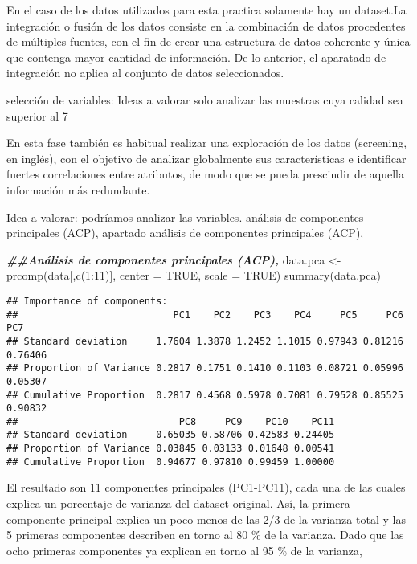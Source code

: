 \documentclass[
]{article}
\newenvironment{Shaded}{\begin{snugshade}}{\end{snugshade}}
\newcommand{\AttributeTok}[1]{\textcolor[rgb]{0.77,0.63,0.00}{#1}}
\newcommand{\ConstantTok}[1]{\textcolor[rgb]{0.00,0.00,0.00}{#1}}
\newcommand{\DecValTok}[1]{\textcolor[rgb]{0.00,0.00,0.81}{#1}}
\newcommand{\DocumentationTok}[1]{\textcolor[rgb]{0.56,0.35,0.01}{\textbf{\textit{#1}}}}
\newcommand{\FunctionTok}[1]{\textcolor[rgb]{0.00,0.00,0.00}{#1}}
\newcommand{\NormalTok}[1]{#1}
\newcommand{\OtherTok}[1]{\textcolor[rgb]{0.56,0.35,0.01}{#1}}
\newcommand{\SpecialCharTok}[1]{\textcolor[rgb]{0.00,0.00,0.00}{#1}}
\begin{document}
En el caso de los datos utilizados para esta practica solamente hay un
dataset.La integración o fusión de los datos consiste en la combinación
de datos procedentes de múltiples fuentes, con el fin de crear una
estructura de datos coherente y única que contenga mayor cantidad de
información. De lo anterior, el aparatado de integración no aplica al
conjunto de datos seleccionados.

selección de variables: Ideas a valorar solo analizar las muestras cuya
calidad sea superior al 7

En esta fase también es habitual realizar una exploración de los datos
(screening, en inglés), con el objetivo de analizar globalmente sus
características e identificar fuertes correlaciones entre atributos, de
modo que se pueda prescindir de aquella información más redundante.

Idea a valorar: podríamos analizar las variables. análisis de
componentes principales (ACP), apartado análisis de componentes
principales (ACP),

\begin{Shaded}
\begin{Highlighting}[]
\DocumentationTok{\#\#Análisis de componentes principales (ACP),}
\NormalTok{data.pca }\OtherTok{\textless{}{-}} \FunctionTok{prcomp}\NormalTok{(data[,}\FunctionTok{c}\NormalTok{(}\DecValTok{1}\SpecialCharTok{:}\DecValTok{11}\NormalTok{)], }\AttributeTok{center =} \ConstantTok{TRUE}\NormalTok{, }\AttributeTok{scale =} \ConstantTok{TRUE}\NormalTok{)}
\FunctionTok{summary}\NormalTok{(data.pca)}
\end{Highlighting}
\end{Shaded}

\begin{verbatim}
## Importance of components:
##                           PC1    PC2    PC3    PC4     PC5     PC6     PC7
## Standard deviation     1.7604 1.3878 1.2452 1.1015 0.97943 0.81216 0.76406
## Proportion of Variance 0.2817 0.1751 0.1410 0.1103 0.08721 0.05996 0.05307
## Cumulative Proportion  0.2817 0.4568 0.5978 0.7081 0.79528 0.85525 0.90832
##                            PC8     PC9    PC10    PC11
## Standard deviation     0.65035 0.58706 0.42583 0.24405
## Proportion of Variance 0.03845 0.03133 0.01648 0.00541
## Cumulative Proportion  0.94677 0.97810 0.99459 1.00000
\end{verbatim}

El resultado son 11 componentes principales (PC1-PC11), cada una de las
cuales explica un porcentaje de varianza del dataset original. Así, la
primera componente principal explica un poco menos de las 2/3 de la
varianza total y las 5 primeras componentes describen en torno al 80 \%
de la varianza. Dado que las ocho primeras componentes ya explican en
torno al 95 \% de la varianza,
\end{document}
